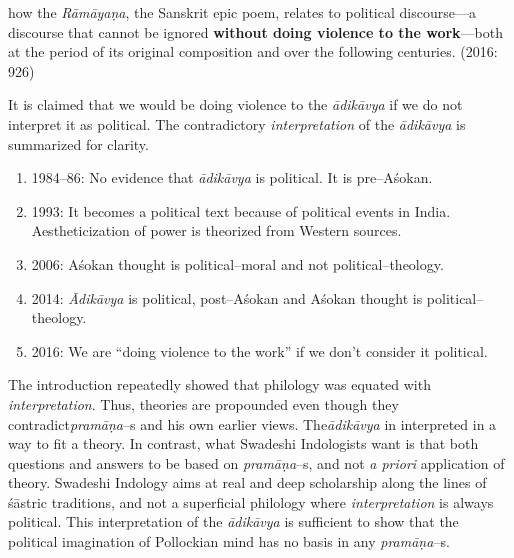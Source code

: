 \newpage

\begin{myquote}
how the \textit{Rāmāyaṇa}, the Sanskrit epic poem, relates to political discourse—a discourse that cannot be ignored \textbf{without doing violence to the work}—both at the period of its original composition and over the following centuries. (2016: 926)
\end{myquote}

It is claimed that we would be doing violence to the \textit{ādikāvya} if we do not interpret it as political. The contradictory \textit{interpretation} of the \textit{ādikāvya }is summarized for clarity.

\begin{enumerate}
\itemsep=0pt
\item 1984–86: No evidence that \textit{ādikāvya }is political. It is pre–Aśokan.

 \item 1993: It becomes a political text because of political events in India. Aestheticization of power is theorized from Western sources.

 \item 2006: Aśokan thought is political–moral and not political–theology.

 \item 2014: \textit{Ādikāvya }is political, post–Aśokan and Aśokan thought is political–theology.

 \item 2016: We are “doing violence to the work” if we don’t consider it political.

\end{enumerate}

The introduction repeatedly showed that philology was equated with \textit{interpretation}. Thus, theories are propounded even though they contradict\textit{pramāṇa}–s and his own earlier views. The\textit{ādikāvya} in interpreted in a way to fit a theory. In contrast, what Swadeshi Indologists want is that both questions and answers to be based on \textit{pramāṇa}–s, and not \textit{a priori} application of theory. Swadeshi Indology aims at real and deep scholarship along the lines of śāstric traditions, and not a superficial philology where \textit{interpretation} is always political. This interpretation of the \textit{ādikāvya }is sufficient to show that the political imagination of Pollockian mind has no basis in any \textit{pramāṇa}–s.


